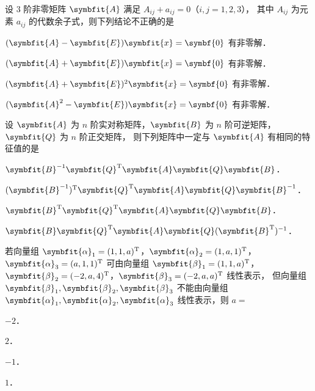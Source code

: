 \begin{question}[index=5]
设 $3$ 阶非零矩阵 $\symbfit{A}$ 满足 $A_{ij}+a_{ij}=0$（$i,j=1,2,3$），
其中 $A_{ij}$ 为元素 $a_{ij}$ 的代数余子式，则下列结论不正确的是
\begin{choices}[columns=2]
\item $(\symbfit{A}-\symbfit{E})\symbfit{x}=\symbf{0}$ 有非零解．
\item $(\symbfit{A}+\symbfit{E})\symbfit{x}=\symbf{0}$ 有非零解．
\item $(\symbfit{A}+\symbfit{E})^2\symbfit{x}=\symbf{0}$ 有非零解．
\item $(\symbfit{A}^2-\symbfit{E})\symbfit{x}=\symbf{0}$ 有非零解．
\end{choices}
\end{question}
\QuestionBreak

\begin{question}[index=6]
设 $\symbfit{A}$ 为 $n$ 阶实对称矩阵，$\symbfit{B}$ 为 $n$ 阶可逆矩阵，$\symbfit{Q}$ 为 $n$ 阶正交矩阵，
则下列矩阵中一定与 $\symbfit{A}$ 有相同的特征值的是
\begin{choices}[columns=2]
\item $\symbfit{B}^{-1}\symbfit{Q}^{\mathrm T}\symbfit{A}\symbfit{Q}\symbfit{B}$．
\item $(\symbfit{B}^{-1})^{\mathrm T}\symbfit{Q}^{\mathrm T}\symbfit{A}\symbfit{Q}\symbfit{B}^{-1}$．
\item $\symbfit{B}^{\mathrm T}\symbfit{Q}^{\mathrm T}\symbfit{A}\symbfit{Q}\symbfit{B}$．
\item $\symbfit{B}\symbfit{Q}^{\mathrm T}\symbfit{A}\symbfit{Q}(\symbfit{B}^{\mathrm T})^{-1}$．
\end{choices}
\end{question}
\QuestionBreak

\begin{question}[index=7]
若向量组 $\symbfit{\alpha}_1=(1,1,a)^{\mathrm T}$，$\symbfit{\alpha}_2=(1,a,1)^{\mathrm T}$，
$\symbfit{\alpha}_3=(a,1,1)^{\mathrm T}$ 可由向量组 $\symbfit{\beta}_1=(1,1,a)^{\mathrm T}$，
$\symbfit{\beta}_2=(-2,a,4)^{\mathrm T}$，$\symbfit{\beta}_3=(-2,a,a)^{\mathrm T}$ 线性表示，
但向量组 $\symbfit{\beta}_1,\symbfit{\beta}_2,\symbfit{\beta}_3$ 不能由向量组
$\symbfit{\alpha}_1,\symbfit{\alpha}_2,\symbfit{\alpha}_3$ 线性表示，则 $a=$
\begin{choices}[columns=4]
\item $-2$．
\item $2$．
\item $-1$．
\item $1$．
\end{choices}
\end{question}
\QuestionBreak

